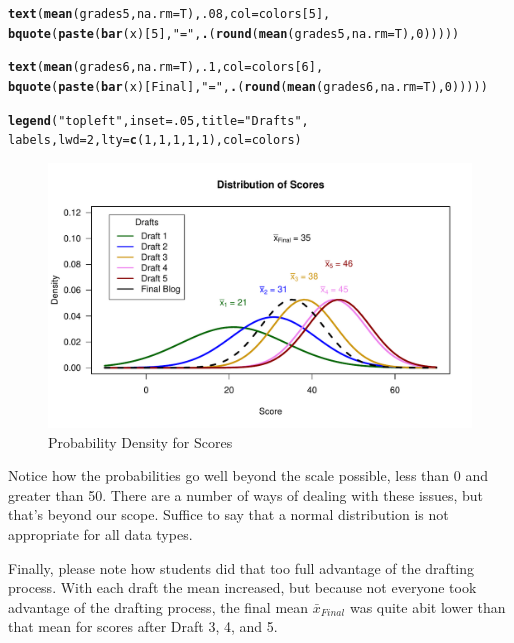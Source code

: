 \documentclass{article}\usepackage[]{graphicx}\usepackage[]{color}
\makeatletter
\def\maxwidth{ %
  \ifdim\Gin@nat@width>\linewidth
    \linewidth
  \else
    \Gin@nat@width
  \fi
}
\newcommand{\hlnum}[1]{\textcolor[rgb]{0.686,0.059,0.569}{#1}}%
\newcommand{\hlstr}[1]{\textcolor[rgb]{0.192,0.494,0.8}{#1}}%
\newcommand{\hlstd}[1]{\textcolor[rgb]{0.345,0.345,0.345}{#1}}%
\newcommand{\hlkwc}[1]{\textcolor[rgb]{0.333,0.667,0.333}{#1}}%
\newcommand{\hlkwd}[1]{\textcolor[rgb]{0.737,0.353,0.396}{\textbf{#1}}}%
\newenvironment{kframe}{%
 \def\at@end@of@kframe{}%
 \ifinner\ifhmode%
  \def\at@end@of@kframe{\end{minipage}}%
  \begin{minipage}{\columnwidth}%
 \fi\fi%
 \def\FrameCommand##1{\hskip\@totalleftmargin \hskip-\fboxsep
 \colorbox{shadecolor}{##1}\hskip-\fboxsep
     \hskip-\linewidth \hskip-\@totalleftmargin \hskip\columnwidth}%
 \MakeFramed {\advance\hsize-\width
   \@totalleftmargin\z@ \linewidth\hsize
   \@setminipage}}%
 {\par\unskip\endMakeFramed%
 \at@end@of@kframe}
\newenvironment{knitrout}{}{} %
\makeatother
\begin{document}
\begin{knitrout}
\begin{kframe}
\begin{alltt}
\hlkwd{text}\hlstd{(}\hlkwd{mean}\hlstd{(grades5,} \hlkwc{na.rm}\hlstd{=T),} \hlnum{.08}\hlstd{,} \hlkwc{col}\hlstd{=colors[}\hlnum{5}\hlstd{],}
     \hlkwd{bquote}\hlstd{(}\hlkwd{paste}\hlstd{(}\hlkwd{bar}\hlstd{(x)[}\hlnum{5}\hlstd{],} \hlstr{" = "}\hlstd{,} \hlkwd{.}\hlstd{(}\hlkwd{round}\hlstd{(}\hlkwd{mean}\hlstd{(grades5,} \hlkwc{na.rm}\hlstd{=T),} \hlnum{0}\hlstd{)))))}

\hlkwd{text}\hlstd{(}\hlkwd{mean}\hlstd{(grades6,} \hlkwc{na.rm}\hlstd{=T),} \hlnum{.1}\hlstd{,} \hlkwc{col}\hlstd{=colors[}\hlnum{6}\hlstd{],}
     \hlkwd{bquote}\hlstd{(}\hlkwd{paste}\hlstd{(}\hlkwd{bar}\hlstd{(x)[Final],} \hlstr{" = "}\hlstd{,} \hlkwd{.}\hlstd{(}\hlkwd{round}\hlstd{(}\hlkwd{mean}\hlstd{(grades6,} \hlkwc{na.rm}\hlstd{=T),} \hlnum{0}\hlstd{)))))}

\hlkwd{legend}\hlstd{(}\hlstr{"topleft"}\hlstd{,} \hlkwc{inset}\hlstd{=}\hlnum{.05}\hlstd{,} \hlkwc{title}\hlstd{=}\hlstr{"Drafts"}\hlstd{,}
  \hlstd{labels,} \hlkwc{lwd}\hlstd{=}\hlnum{2}\hlstd{,} \hlkwc{lty}\hlstd{=}\hlkwd{c}\hlstd{(}\hlnum{1}\hlstd{,} \hlnum{1}\hlstd{,} \hlnum{1}\hlstd{,} \hlnum{1}\hlstd{,} \hlnum{1}\hlstd{),} \hlkwc{col}\hlstd{=colors)}
\end{alltt}
\end{kframe}\begin{figure}
\includegraphics[width=\maxwidth]{figure/scoresdensity-1} \caption[Probability Density for Scores]{Probability Density for Scores}\label{fig:scoresdensity}
\end{figure}


\end{knitrout}

Notice how the probabilities go well beyond the scale possible, less than 0 and greater than 50. There are a number of ways of dealing with these issues, but that's beyond our scope. Suffice to say that a normal distribution is not appropriate for all data types. 

Finally, please note how students did that too full advantage of the drafting process. With each draft the mean increased, but because not everyone took advantage of the drafting process, the final mean $\bar{x}_{Final}$ was quite abit lower than that mean for scores after Draft 3, 4, and 5. 
\end{document}
